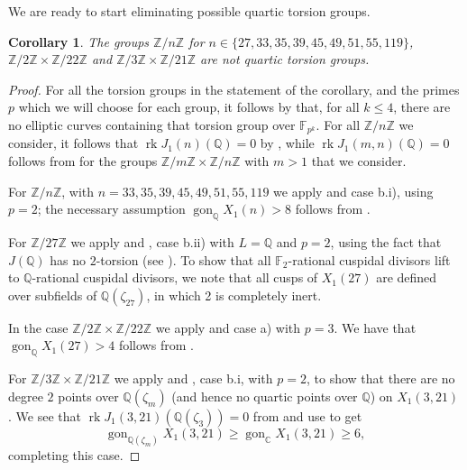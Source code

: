 \documentclass[11pt,reqno]{amsart}
\DeclareMathOperator{\rk}{rk}
\DeclareMathOperator{\gon}{gon}
\newtheorem{corollary}[theorem]{Corollary}
\theoremstyle{definition}
\numberwithin{equation}{section}
\newcommand{\Q}{\mathbb{Q}}
\newcommand{\C}{\mathbb{C}}
\newcommand{\F}{\mathbb{F}}
\def\torz#1{\mathbb Z /#1 \mathbb Z}
\def\tg#1#2{\mathbb Z/#1\mathbb Z \times \mathbb Z /#2 \mathbb Z}
\begin{document}
We are ready to start eliminating possible quartic torsion groups.


\begin{corollary}\label{cor:easy}
    The groups $\torz{n}$ for $n\in\{27, 33,35,39 ,45,49,51,55,119\}$, $\tg{2}{22}$ and $\tg{3}{21}$ are not quartic torsion groups. 
\end{corollary}
\begin{proof}
    For all the torsion groups in the statement of the corollary, and the primes $p$ which we will choose for each group, it follows by  that, for all $k\leq 4$, there are no elliptic curves containing that torsion group over $\F_{p^k}$.
    For all $\torz{n}$ we consider, it follows that $\rk J_1(n)(\Q)=0$ by \cite[Theorem 3.1]{Deg3Class}, while $\rk J_1(m,n)(\Q)=0$ follows from \cite[Theorem 4.1]{DerickxSutherland} for the groups $\tg{m}{n}$ with $m>1$ that we consider.
    
    For $\torz{n}$, with $n=33,35,39 ,45,49,51,55,119$ we apply  and  case b.i), using $p=2$; the necessary assumption $\gon_\Q X_1(n)>8$ follows from \cite[Theorem 3]{derickxVH}. 
    
    For $\torz{27}$ we apply  and , case b.ii) with $L=\Q$ and $p=2$, using the fact that $J(\Q)$ has no $2$-torsion (see \cite[Table2]{Deg3Class}). To show that all $\F_2$-rational cuspidal divisors lift to $\Q$-rational cuspidal divisors, we note that all cusps of $X_1(27)$ are defined over subfields of $\Q(\zeta_{27})$, in which 2 is completely inert. 

    In the case $\tg{2}{22}$ we apply  and  case a) with $p=3$. We have that $\gon_\Q X_1(27)>4$ follows from \cite[Theorem 3]{derickxVH}.

    For $\tg{3}{21}$ we apply  and , case b.i, with $p=2$, to show that there are no degree $2$ points over $\Q(\zeta_m)$ (and hence no quartic points over $\Q$) on $X_1(3,21)$. We see that $\rk J_1(3,21)(\Q(\zeta_3))=0$ from \cite[Theorem 4.1]{DerickxSutherland} and use  to get
    $$\gon_{\Q(\zeta_m)} X_1(3,21)\geq\gon_{\C} X_1(3,21) \geq 6,$$
    completing this case. 
    
    

\end{proof}
\end{document}
